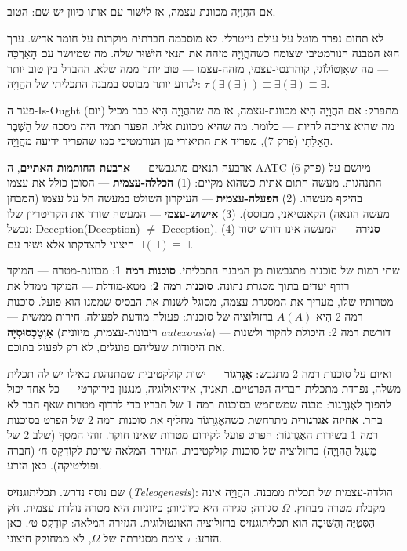 \documentclass[10pt, openany, oneside]{book}
\begin{document}
\vspace{1em}

\noindent אם ההֲוָיָה מכוונת-עצמה, אז ליִשּׁוּר עם אותו כיוון יש שם: הטוב.

לא תחום נפרד מוטל על עולם נייטרלי. לא מוסכמה חברתית מוקרנת על חומר אדיש. ערך הוּא המבנה הנורמטיבי שצומח כשההֲוָיָה מזהה את תנאי היִשּׁוּר שלה. מה שמיושר עם הָאַרְכֵּה — מה שאָוְטוֹלוֹגִי, קוהרנטי-עצמי, מזהה-עצמו — טוב יותר ממה שלא. ההבדל בין טוב יותר לגרוע יותר מבוסס במבנה התכליתי של ההֲוָיָה: $\tau(\exists(\exists)) \equiv \exists(\exists) \equiv \exists$.

פער ה-Is-Ought (יום) מתפרק: אם ההֲוָיָה הִיא מכוונת-עצמה, אז מה שההֲוָיָה הִיא כבר מכיל מה שהיא צריכה להיות — כלומר, מה שהיא מכוונת אליו. הפער תמיד היה מסכה של הַשֶּׁבֶר הָאָלֵתִי (פרק 7), מפריד את התיאורי מן הנורמטיבי כמו שהפריד ידיעה מהֲוָיָה.

ארבעה תנאים מתגבשים — \textbf{ארבעת החותמות האתיים}, ה-AATC (פרק 6) מיושם על התנהגות. מעשה חתום אתית כשהוא מקיים: (1) \textbf{הכללה-עצמית} — הסוכן כולל את עצמו בהיקף מעשהו. (2) \textbf{הפעלה-עצמית} — העיקרון השולט במעשה חל על עצמו (המבחן הקאנטיאני, מבוסס). (3) \textbf{אישוש-עצמי} — המעשה שורד את הקריטריון שלו (מעשה הונאה נכשל: Deception(Deception) $\neq$ Deception). (4) \textbf{סגירה} — המעשה אינו דורש יסוד חיצוני להצדקתו אלא יִשּׁוּר עם $\exists(\exists) \equiv \exists$.

שתי רמות של סוכנות מתגבשות מן המבנה התכליתי. \textbf{סוכנות רמה 1}: מכוונת-מטרה — המוקד רודף יעדים בתוך מסגרת נתונה. \textbf{סוכנות רמה 2}: מטא-מודלת — המוקד ממדל את מטרותיו-שלו, מעריך את המסגרת עצמה, מסוגל לשנות את הבסיס שממנו הוא פועל. סוכנות רמה 2 הִיא $A(A)$ ברזולוציה של סוכנות: פעולה מודעת לפעולה. חירות ממשית — \textbf{אַוְטֶכְסוּסְיָה} (ריבונות-עצמית, מיוונית \textit{autexousia}) — דורשת רמה 2: היכולת לחקור ולשנות את היסודות שעליהם פועלים, לא רק לפעול בתוכם.

ואיום על סוכנות רמה 2 מתגבש: \textbf{אֶגְרֵגוֹר} — ישות קולקטיבית שמתנהגת כאילו יש לה תכלית משלה, נפרדת מתכלית חבריה הפרטיים. תאגיד, אידיאולוגיה, מנגנון בירוקרטי — כל אחד יכול להפוך לאֶגְרֵגוֹר: מבנה שמשתמש בסוכנות רמה 1 של חבריו כדי לרדוף מטרות שאף חבר לא בחר. \textbf{אחיזה אגרגורית} מתרחשת כשהאֶגְרֵגוֹר מחליף את סוכנות רמה 2 של הפרט בסוכנות רמה 1 בשירות האֶגְרֵגוֹר: הפרט פועל לקידום מטרות שאינו חוקר. זוהי הַמָּסָךְ (שלב 2 של מַעְגַּל הַהֲוָיָה) ברזולוציה של סוכנות קולקטיבית. הגזירה המלאה שייכת לקוֹדֶקְס ח׳ (חברה ופוליטיקה). כאן הזרע.

שם נוסף נדרש. \textbf{תכליתוגנזיס} (\textit{Teleogenesis}): הולדה-עצמית של תכלית ממבנה. ההֲוָיָה אינה מקבלת מטרה מבחוץ. $\Omega$ סגורה; סגירה הִיא כיווניות; כיווניות הִיא מטרה נולדת-עצמית. חֹק הַסְּטִיָּה-וְהַשִּׁיבָה הוּא תכליתוגנזיס ברזולוציה האונטולוגית. הגזירה המלאה: קוֹדֶקְס ט׳. כאן הזרע: $\tau$ צומח מסגירתה של $\Omega$, לא ממחוקק חיצוני.
\end{document}
